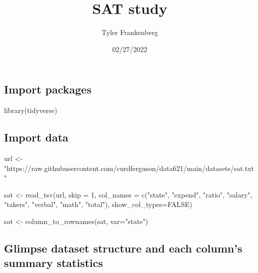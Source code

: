 \documentclass[
]{article}
\title{SAT study}
\author{Tyler Frankenberg}
\date{02/27/2022}
\newenvironment{Shaded}{\begin{snugshade}}{\end{snugshade}}
\newcommand{\AttributeTok}[1]{\textcolor[rgb]{0.77,0.63,0.00}{#1}}
\newcommand{\ConstantTok}[1]{\textcolor[rgb]{0.00,0.00,0.00}{#1}}
\newcommand{\DecValTok}[1]{\textcolor[rgb]{0.00,0.00,0.81}{#1}}
\newcommand{\FunctionTok}[1]{\textcolor[rgb]{0.00,0.00,0.00}{#1}}
\newcommand{\NormalTok}[1]{#1}
\newcommand{\OtherTok}[1]{\textcolor[rgb]{0.56,0.35,0.01}{#1}}
\newcommand{\StringTok}[1]{\textcolor[rgb]{0.31,0.60,0.02}{#1}}
\begin{document}
\maketitle

\hypertarget{import-packages}{%
\subsection{Import packages}\label{import-packages}}

\begin{Shaded}
\begin{Highlighting}[]
\FunctionTok{library}\NormalTok{(tidyverse)}
\end{Highlighting}
\end{Shaded}

\hypertarget{import-data}{%
\subsection{Import data}\label{import-data}}

\begin{Shaded}
\begin{Highlighting}[]
\NormalTok{url }\OtherTok{\textless{}{-}} \StringTok{"https://raw.githubusercontent.com/curdferguson/data621/main/datasets/sat.txt"}

\NormalTok{sat }\OtherTok{\textless{}{-}} \FunctionTok{read\_tsv}\NormalTok{(url, }\AttributeTok{skip =} \DecValTok{1}\NormalTok{, }\AttributeTok{col\_names =} \FunctionTok{c}\NormalTok{(}\StringTok{"state"}\NormalTok{, }\StringTok{"expend"}\NormalTok{, }\StringTok{"ratio"}\NormalTok{, }\StringTok{"salary"}\NormalTok{, }\StringTok{"takers"}\NormalTok{, }\StringTok{"verbal"}\NormalTok{, }\StringTok{"math"}\NormalTok{, }\StringTok{"total"}\NormalTok{), }\AttributeTok{show\_col\_types=}\ConstantTok{FALSE}\NormalTok{)}

\NormalTok{sat }\OtherTok{\textless{}{-}} \FunctionTok{column\_to\_rownames}\NormalTok{(sat, }\AttributeTok{var=}\StringTok{"state"}\NormalTok{)}
\end{Highlighting}
\end{Shaded}

\hypertarget{glimpse-dataset-structure-and-each-columns-summary-statistics}{%
\subsection{Glimpse dataset structure and each column's summary
statistics}\label{glimpse-dataset-structure-and-each-columns-summary-statistics}}
\end{document}
